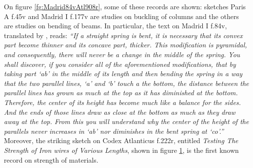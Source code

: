 On figure \ref{fg:Madrid84vAtl908r}, some of these records are shown: sketches Paris A f.45v and Madrid I f.177v are studies on buckling of columns and the others are studies on bending of beams. In particular, the text on Madrid I f.84v, translated by \cite{zammattio_1980}, reads: \emph{``If a straight spring is bent, it is necessary that its convex part become thinner and its concave part, thicker. This modification is pyramidal, and consequently, there will never be a change in the middle of the spring. You shall discover, if you consider all of the aforementioned modifications, that by taking part `ab' in the middle of its length and then bending the spring in a way that the two parallel lines, `a' and `b' touch a the bottom, the distance between the parallel lines has grown as much at the top as it has diminished at the bottom. Therefore, the center of its height has become much like a balance for the sides. And the ends of those lines draw as close at the bottom as much as they draw away at the top. From this you will understand why the center of the height of the parallels never increases in `ab' nor diminishes in the bent spring at `co'.''} Moreover, the striking sketch on Codex Atlanticus f.222r, entitled \emph{Testing The Strength of Iron wires of Various Lengths}, shown in figure \ref{fg:Atl222r}, is the first known record on strength of materials. 
\begin{figure}[!ht]
	\centering
	\begin{center}
	\end{center}
	\label{fg:Atl222r}
\end{figure}

